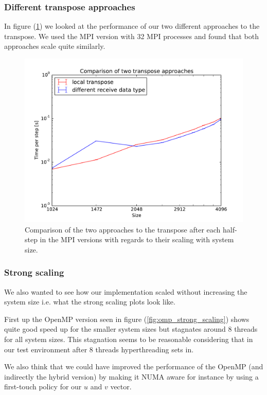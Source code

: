 \documentclass[11pt,a4paper]{article} %
\begin{document}
\subsubsection{Different transpose approaches}

In figure (\ref{fig:transpose_system_size_scaling}) we looked at the performance of our two different approaches to the transpose.
We used the MPI version with 32 MPI processes and found that both approaches scale quite similarly.


\begin{figure}
\includegraphics[width=\textwidth]{mpi_transpose_32.pdf}
\caption{Comparison of the two approaches to the transpose after each half-step in the MPI versions with regards to their scaling with system size.}
\label{fig:transpose_system_size_scaling}
\end{figure}

\subsubsection{Strong scaling}

We also wanted to see how our implementation scaled without increasing the system size i.e. what the strong scaling plots look like.

First up the OpenMP version seen in figure (\ref{fig:omp_strong_scaling}) shows quite good speed up for the smaller system sizes but stagnates around 8 threads for all system sizes.
This stagnation seems to be reasonable considering that in our test environment after 8 threads hyperthreading sets in.

We also think that we could have improved the performance of the OpenMP (and indirectly the hybrid version) by making it NUMA aware for instance by using a first-touch policy for our $u$ and $v$ vector. \\
\end{document}
